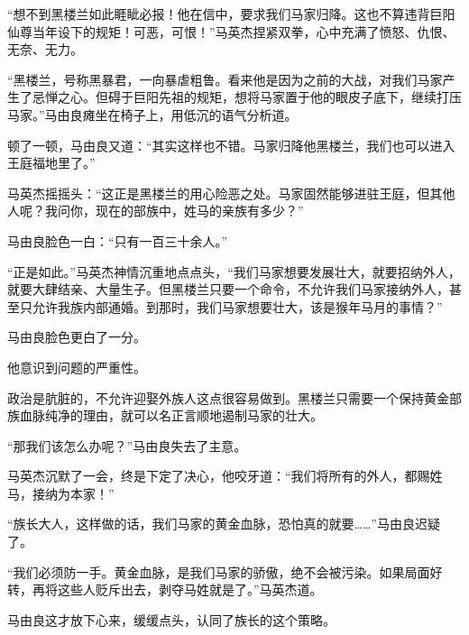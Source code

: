\begin{this_body}
“想不到黑楼兰如此睚眦必报！他在信中，要求我们马家归降。这也不算违背巨阳仙尊当年设下的规矩！可恶，可恨！”马英杰捏紧双拳，心中充满了愤怒、仇恨、无奈、无力。

“黑楼兰，号称黑暴君，一向暴虐粗鲁。看来他是因为之前的大战，对我们马家产生了忌惮之心。但碍于巨阳先祖的规矩，想将马家置于他的眼皮子底下，继续打压马家。”马由良瘫坐在椅子上，用低沉的语气分析道。

顿了一顿，马由良又道：“其实这样也不错。马家归降他黑楼兰，我们也可以进入王庭福地里了。”

马英杰摇摇头：“这正是黑楼兰的用心险恶之处。马家固然能够进驻王庭，但其他人呢？我问你，现在的部族中，姓马的亲族有多少？”

马由良脸色一白：“只有一百三十余人。”

“正是如此。”马英杰神情沉重地点点头，“我们马家想要发展壮大，就要招纳外人，就要大肆结亲、大量生子。但黑楼兰只要一个命令，不允许我们马家接纳外人，甚至只允许我族内部通婚。到那时，我们马家想要壮大，该是猴年马月的事情？”

马由良脸色更白了一分。

他意识到问题的严重性。

政治是肮脏的，不允许迎娶外族人这点很容易做到。黑楼兰只需要一个保持黄金部族血脉纯净的理由，就可以名正言顺地遏制马家的壮大。

“那我们该怎么办呢？”马由良失去了主意。

马英杰沉默了一会，终是下定了决心，他咬牙道：“我们将所有的外人，都赐姓马，接纳为本家！”

“族长大人，这样做的话，我们马家的黄金血脉，恐怕真的就要……”马由良迟疑了。

“我们必须防一手。黄金血脉，是我们马家的骄傲，绝不会被污染。如果局面好转，再将这些人贬斥出去，剥夺马姓就是了。”马英杰道。

马由良这才放下心来，缓缓点头，认同了族长的这个策略。

\end{this_body}

